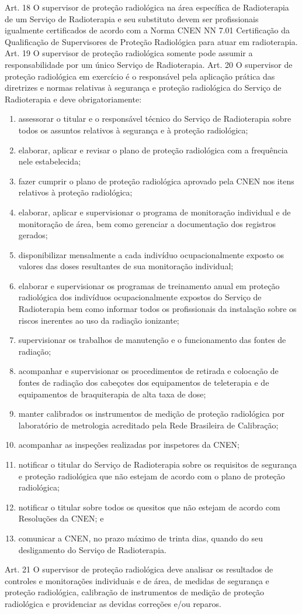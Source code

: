 \noindent Art. 18 O supervisor de proteção radiológica na área específica de Radioterapia de um Serviço de Radioterapia e seu substituto devem ser profissionais igualmente certificados de acordo com a Norma CNEN NN 7.01 Certificação da Qualificação de Supervisores de Proteção Radiológica para atuar em radioterapia.
\noindent Art. 19 O supervisor de proteção radiológica somente pode assumir a responsabilidade por um único Serviço de Radioterapia.
\noindent Art. 20 O supervisor de proteção radiológica em exercício é o responsável pela aplicação prática das diretrizes e normas relativas à segurança e proteção radiológica do Serviço de Radioterapia e deve obrigatoriamente:
\begin{enumerate}[label=\Roman*.]
    \item assessorar o titular e o responsável técnico do Serviço de Radioterapia sobre todos os assuntos relativos à segurança e à proteção radiológica;
    \item elaborar, aplicar e revisar o plano de proteção radiológica com a frequência nele estabelecida;	
	\item fazer cumprir o plano de proteção radiológica aprovado pela CNEN nos itens relativos à proteção radiológica;
    \item elaborar, aplicar e supervisionar o programa de monitoração individual e de monitoração de área, bem como gerenciar a documentação dos registros gerados;
    \item disponibilizar mensalmente a cada indivíduo ocupacionalmente exposto os valores das doses resultantes de sua monitoração individual;
    \item elaborar e supervisionar os programas de treinamento anual em proteção radiológica dos indivíduos ocupacionalmente expostos do Serviço de Radioterapia bem como informar todos os profissionais da instalação sobre os riscos inerentes ao uso da radiação ionizante;
    \item supervisionar os trabalhos de manutenção e o funcionamento das fontes de radiação;
    \item acompanhar e supervisionar os procedimentos de retirada e colocação de fontes de radiação dos cabeçotes dos equipamentos de teleterapia e de equipamentos de braquiterapia de alta taxa de dose;
    \item manter calibrados os instrumentos de medição de proteção radiológica por laboratório de metrologia acreditado pela Rede Brasileira de Calibração;
    \item acompanhar as inspeções realizadas por inspetores da CNEN;
    \item notificar o titular do Serviço de Radioterapia sobre os requisitos de segurança e proteção radiológica que não estejam de acordo com o plano de proteção radiológica;
    \item notificar o titular sobre todos os quesitos que não estejam de acordo com Resoluções da CNEN; e
    \item comunicar a CNEN, no prazo máximo de trinta dias, quando do seu desligamento do Serviço de Radioterapia.
\end{enumerate}
\noindent Art. 21 O supervisor de proteção radiológica deve analisar os resultados de controles e monitorações individuais e de área, de medidas de segurança e proteção radiológica, calibração de instrumentos de medição de proteção radiológica e providenciar as devidas correções e/ou reparos.